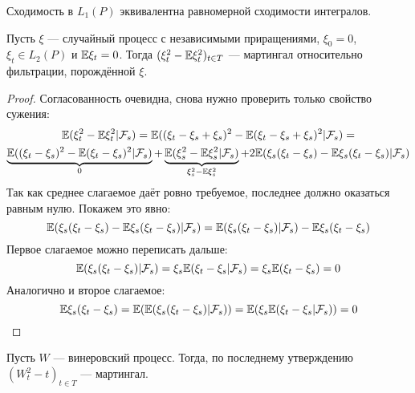 \begin{note}
	Сходимость в $L_1(P)$ эквивалентна равномерной сходимости интегралов.
\end{note}

\begin{proposition}
	Пусть $\xi$ --- случайный процесс с независимыми приращениями, $\xi_0 = 0$, $\xi_t \in L_2(P)$ и $\mathbb{E} \xi_t = 0$. Тогда $(\xi_t^2 - \mathbb{E}\xi_t^2)_{t \in T}$ --- мартингал относительно фильтрации, порождённой $\xi$.
\end{proposition}

\begin{proof}
	Согласованность очевидна, снова нужно проверить только свойство сужения:
	\begin{multline*}
		\mathbb{E}(\xi_t^2 - \mathbb{E}\xi_t^2 | \mathcal{F}_s) = \mathbb{E}((\xi_t - \xi_s + \xi_s)^2 - \mathbb{E}(\xi_t - \xi_s + \xi_s)^2 | \mathcal{F}_s) =
		\\
		\underbrace{\mathbb{E}((\xi_t - \xi_s)^2 - \mathbb{E}(\xi_t - \xi_s)^2 | \mathcal{F}_s)}_{0} + \underbrace{\mathbb{E}(\xi_s^2 - \mathbb{E}\xi_s^2 | \mathcal{F}_s)}_{\xi_s^2 - \mathbb{E}\xi_s^2} + 2\mathbb{E}(\xi_s(\xi_t - \xi_s) - \mathbb{E}\xi_s(\xi_t - \xi_s) | \mathcal{F}_s)
	\end{multline*}
	Так как среднее слагаемое даёт ровно требуемое, последнее должно оказаться равным нулю. Покажем это явно:
	\[
		\mathbb{E}(\xi_s(\xi_t - \xi_s) - \mathbb{E}\xi_s(\xi_t - \xi_s) | \mathcal{F}_s) = \mathbb{E}(\xi_s(\xi_t - \xi_s) | \mathcal{F}_s) - \mathbb{E}\xi_s(\xi_t - \xi_s)
	\]
	Первое слагаемое можно переписать дальше: 
	\[
		\mathbb{E}(\xi_s(\xi_t - \xi_s) | \mathcal{F}_s) = \xi_s\mathbb{E}(\xi_t - \xi_s | \mathcal{F}_s) = \xi_s \mathbb{E}(\xi_t - \xi_s) = 0
	\]
	Аналогично и второе слагаемое:
	\[
		\mathbb{E}\xi_s(\xi_t - \xi_s) = \mathbb{E}(\mathbb{E}(\xi_s(\xi_t - \xi_s) | \mathcal{F}_s)) = \mathbb{E}(\xi_s\mathbb{E}(\xi_t - \xi_s | \mathcal{F}_s)) = 0
	\]
\end{proof}

\begin{example}
	Пусть $W$ --- винеровский процесс. Тогда, по последнему утверждению $(W_t^2 - t)_{t \in T}$ --- мартингал.
\end{example}